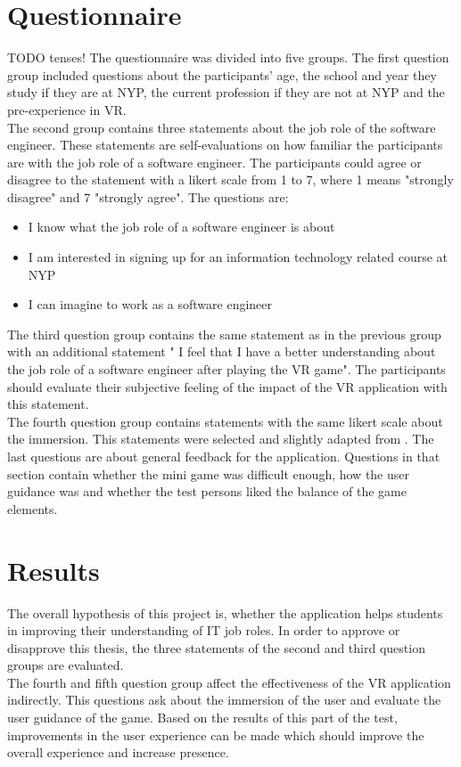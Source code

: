 \section{Questionnaire}
TODO tenses!
The questionnaire was divided into five groups. The first question group included questions about the participants' age, the school and year they study if they are at NYP, the current profession if they are not at NYP and the pre-experience in VR.\\
The second group contains three statements about the job role of the software engineer. These statements are self-evaluations on how familiar the participants are with the job role of a software engineer. The participants could agree or disagree to the statement with a likert scale from 1 to 7, where 1 means "strongly disagree" and 7 "strongly agree". The questions are:
\begin{itemize}
\item I know what the job role of a software engineer is about 
\item  I am interested in signing up for an information technology related course at NYP 
\item  I can imagine to work as a software engineer 
\end{itemize}
The third question group contains the same statement as in the previous group with an additional statement " I feel that I have a better understanding about the job role of a software engineer after playing the VR game". The participants should evaluate their subjective feeling of the impact of the VR application with this statement.\\
The fourth question group contains statements with the same likert scale about the immersion. This statements were selected and slightly adapted from \cite{??}.
The last questions are about general feedback for the application. Questions in that section contain whether the mini game was difficult enough, how the user guidance was and whether the test persons liked the balance of the game elements.

\section{Results}
The overall hypothesis of this project is, whether the application helps students in improving their understanding of IT job roles.
In order to approve or disapprove this thesis, the three statements of the second and third question groups are evaluated.\\
The fourth and fifth question group affect the effectiveness of the VR application indirectly. This questions ask about the immersion of the user and evaluate the user guidance of the game. Based on the results of this part of the test, improvements in the user experience can be made which should improve the overall experience and increase presence.
